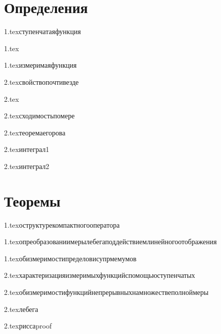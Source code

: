 

\usepackage{sectsty}

\allsectionsfont{\raggedright}
\subsectionfont{\fontsize{14}{15}\selectfont}

\cfoot{}
\rfoot{}




\section{Определения}

{1.tex}{ступенчатаяфункция}
\label{ступенчатая функция}

{1.tex}{}

{1.tex}{измеримаяфункция}

{2.tex}{свойствопочтивезде}

{2.tex}{}

{2.tex}{сходимостьпомере}

{2.tex}{теоремаегорова}

{2.tex}{интеграл1}

{2.tex}{интеграл2}

\section{Теоремы}

{1.tex}{оструктурекомпактногооператора}

{1.tex}{опреобразованиимерылебегаподдействиемлинейногоотображения}

{1.tex}{обизмеримостипределовисупрмемумов}

{2.tex}{характеризацияизмеримыхфункцийспомощьюступенчатых}

{2.tex}{обизмеримостифункцийнепрерывныхнамножествеполноймеры}

{2.tex}{лебега}

{2.tex}{риссаproof}

